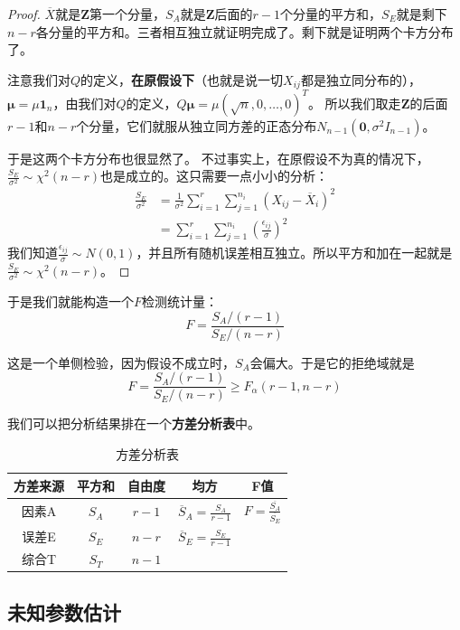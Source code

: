 \begin{proof}
$\overline{X}$就是$\mathbf{Z}$第一个分量，$S_A$就是$\mathbf{Z}$后面的$r-1$个分量的平方和，$S_E$就是剩下$n-r$各分量的平方和。三者相互独立就证明完成了。剩下就是证明两个卡方分布了。

注意我们对$Q$的定义，\textbf{在原假设下}（也就是说一切$X_{ij}$都是独立同分布的），$\boldsymbol{\mu} = \mu\mathbf{1}_n$，由我们对$Q$的定义，$Q\boldsymbol{\mu} = \mu(\sqrt{n},0,\ldots,0)^T$。
所以我们取走$\mathbf{Z}$的后面$r-1$和$n-r$个分量，它们就服从独立同方差的正态分布$N_{n-1}(\mathbf{0},\sigma^2I_{n-1})$。

于是这两个卡方分布也很显然了。
不过事实上，在原假设不为真的情况下，$\frac{S_E}{\sigma^2}\sim \chi^2(n-r)$也是成立的。这只需要一点小小的分析：
\begin{align*}
\frac{S_E}{\sigma^2} &= \frac1{\sigma^2}\sum_{i=1}^r \sum_{j=1}^{n_i} (X_{ij} - \overline{X}_i)^2 \\
&= \sum_{i=1}^r \sum_{j=1}^{n_i} \left(\frac{\epsilon_{ij}}{\sigma}\right)^2
\end{align*}
我们知道$\frac{\epsilon_{ij}}{\sigma} \sim N(0,1)$，并且所有随机误差相互独立。所以平方和加在一起就是$\frac{S_E}{\sigma^2}\sim \chi^2(n-r)$。
\end{proof}


于是我们就能构造一个$F$检测统计量：
\[
F=\frac{S_A/(r-1)}{S_E/(n-r)}
\]

这是一个单侧检验，因为假设不成立时，$S_A$会偏大。于是它的拒绝域就是
\[
F=\frac{S_A/(r-1)}{S_E/(n-r)}\geq F_\alpha(r-1,n-r)
\]

我们可以把分析结果排在一个\textbf{方差分析表}中。

\begin{table}[htbp]
    \centering
    \renewcommand{\arraystretch}{1.5}
    \begin{tabular}{c|c|c|c|c}
    \hline
方差来源    &平方和    &自由度    &均方 &F值  \\
    \hline
因素A      & $S_A$   & $r-1$     & $\overline{S}_A=\frac{S_A}{r-1}$ & $F=\frac{\overline{S_A}}{\overline{S_E}}$ \\
    \hline
误差E      & $S_E$   & $n-r$     & $\overline{S}_E=\frac{S_E}{r-1}$ &\\
    \hline
综合T      & $S_T$   & $n-1$    & &\\
    \hline
\end{tabular}
    \caption{方差分析表}
    \label{tab:anova}
\end{table}

\subsection{未知参数估计}


